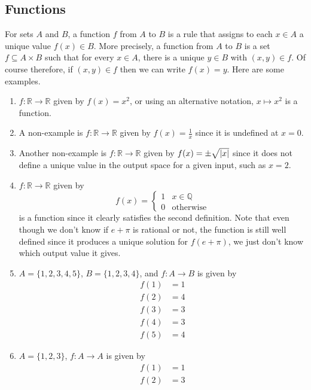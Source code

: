 \subsection{Functions}
For sets \(A\) and \(B\), a function \(f\) from \(A\) to \(B\) is a rule that assigns to each \(x \in A\) a unique value \(f(x) \in B\). More precisely, a function from \(A\) to \(B\) is a set \(f \subseteq A \times B\) such that for every \(x \in A\), there is a unique \(y \in B\) with \((x, y) \in f\). Of course therefore, if \((x, y) \in f\) then we can write \(f(x) = y\). Here are some examples.
\begin{enumerate}
	\item \(f\colon \mathbb R \to \mathbb R\) given by \(f(x) = x^2\), or using an alternative notation, \(x \mapsto x^2\) is a function.
	\item A non-example is \(f\colon \mathbb R \to \mathbb R\) given by \(f(x) = \frac{1}{x}\) since it is undefined at \(x=0\).
	\item Another non-example is \(f\colon \mathbb R \to \mathbb R\) given by \(f(x) = \pm \sqrt{\abs{x}}\) since it does not define a unique value in the output space for a given input, such as \(x=2\).
	\item \(f\colon \mathbb R \to \mathbb R\) given by
	      \[ f(x) = \begin{cases}
			      1 & x \in \mathbb Q  \\
			      0 & \text{otherwise}
		      \end{cases} \]
	      is a function since it clearly satisfies the second definition. Note that even though we don't know if \(e + \pi\) is rational or not, the function is still well defined since it produces a unique solution for \(f(e + \pi)\), we just don't know which output value it gives.
	\item \(A = \{ 1, 2, 3, 4, 5 \}\), \(B = \{ 1, 2, 3, 4 \}\), and \(f\colon A \to B\) is given by
	      \begin{align*}
		      f(1) & = 1 \\
		      f(2) & = 4 \\
		      f(3) & = 3 \\
		      f(4) & = 3 \\
		      f(5) & = 4
	      \end{align*}
	\item \(A = \{ 1, 2, 3 \}\), \(f\colon A \to A\) is given by
	      \begin{align*}
		      f(1) & = 1 \\
		      f(2) & = 3 \\

\end{align*}
\end{enumerate}
